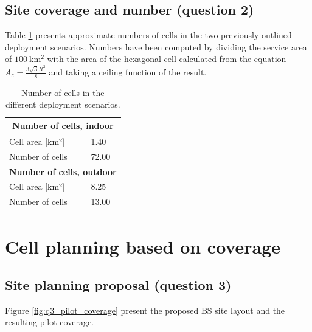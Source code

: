 \documentclass{article}
\begin{document}
\subsection{Site coverage and number (question 2)}

Table \ref{tab:cell_numbers} presents approximate numbers of cells in the two previously outlined deployment scenarios. Numbers have been computed by dividing the service area of \(\SI{100}{\kilo\metre\squared}\) with the area of the hexagonal cell calculated from the equation \(A_c = \frac{3 \sqrt{3} R^2}{8} \) and taking a ceiling function of the result.

\begin{table}[!htb]
    \centering
    \begin{tabular}{|l|l|}
    \hline
    \multicolumn{2}{|c|}{\textbf{Number of cells, indoor}} \\ \hline
    Cell area {[}km²{]}                    & 1.40                                        \\ \hline
    Number of cells                        & 72.00                                       \\ \hline
    \multicolumn{2}{|c|}{\textbf{Number of cells, outdoor}} \\ \hline
    Cell area {[}km²{]}                    & 8.25                                        \\ \hline
    Number of cells                        & 13.00                                       \\ \hline
    \end{tabular}
    \caption{Number of cells in the different deployment scenarios.}
    \label{tab:cell_numbers}
\end{table}

\newpage
\section{Cell planning based on coverage}
\subsection{Site planning proposal (question 3)}
Figure \ref{fig:q3_pilot_coverage} present the proposed BS site layout and the resulting pilot coverage.
\end{document}
